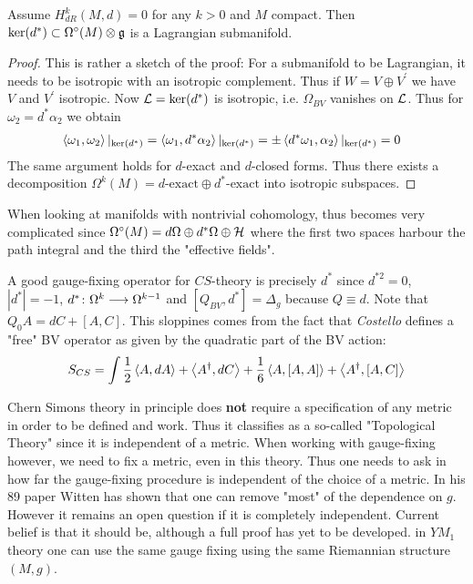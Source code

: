 \begin{prop}
  Assume $H^k_{dR}(M,d) = 0$ for any $k > 0$ and $M$ compact. Then $\ker(d^*) \subset \Omega^\circ(M) \otimes \mathfrak{g}$ is a Lagrangian submanifold.
\begin{proof}
  This is rather a sketch of the proof: For a submanifold to be Lagrangian, it needs to be isotropic with an isotropic complement. Thus if $W = V \oplus V^\prime$ we have $V$ and $V^\prime$ isotropic. Now $\mathcal{L} = \ker(d^*)$ is isotropic, i.e. $\Omega_{BV}$ vanishes on $\mathcal{L}$. Thus for $\omega_2 = d^* \alpha_2$ we obtain
  \begin{align}
    &\left\langle \omega_1 , \omega_2 \right\rangle|_{\ker(d^*)} = \left\langle \omega_1 , d^* \alpha_2 \right\rangle|_{\ker(d^*)} = \pm \left\langle d^* \omega_1 , \alpha_2 \right\rangle|_{\ker(d^*)} = 0
  \end{align}
  The same argument holds for $d$-exact and $d$-closed forms. Thus there exists a decomposition $\Omega^k(M) = d\text{-exact} \oplus d^*\text{-exact}$ into isotropic subspaces.
\end{proof}
\end{prop}

\begin{rem}
  When looking at manifolds with nontrivial cohomology, thus becomes very complicated since
  $\Omega^\circ(M) = d\Omega \oplus d^* \Omega \oplus {\mathcal{H}}$
  where the first two spaces harbour the path integral and the third the "effective fields".
\end{rem}

A good gauge-fixing operator for $CS$-theory is precisely $d^*$ since $d^{*2} = 0$, $|d^*| = -1$, $d^* \colon \Omega^k \longrightarrow \Omega^{k-1}$ and $[Q_{BV}, d^*] = \Delta_g$ because $Q \equiv d$. Note that $Q_0 A = dC + [A,C]$. This sloppines comes from the fact that \textit{Costello} \cite{Costello} defines a "free" BV operator as given by the quadratic part of the BV action:
\begin{equation}
  S_{CS} = \int \frac{1}{2} \left\langle A , dA \right\rangle + \left\langle A^\dagger , dC \right\rangle + \frac{1}{6} \left\langle A , [A,A] \right\rangle + \left\langle A^\dagger , [A,C] \right\rangle
\end{equation}

\begin{rem}
  Chern Simons theory in principle does \textbf{not} require a specification of any metric in order to be defined and work. Thus it classifies as a so-called "Topological Theory" since it is independent of a metric. When working with gauge-fixing however, we need to fix a metric, even in this theory. Thus one needs to ask in how far the gauge-fixing procedure is independent of the choice of a metric. In his 89 paper %
  Witten has shown that one can remove "most" of the dependence on $g$. However it remains an open question if it is completely independent. Current belief is that it should be, although a full proof has yet to be developed. in $YM_1$ theory one can use the same gauge fixing using the same Riemannian structure $(M,g)$.
\end{rem}

